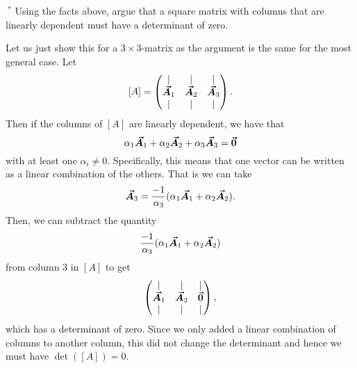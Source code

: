 \documentclass[12pt]{article} %
\begin{document}
\newpage
\begin{problem}$\boldsymbol{~^*}$
Using the facts above, argue that a square matrix with columns that are linearly dependent must have a determinant of zero.
\end{problem}
\begin{solution}
Let us just show this for a $3\times 3$-matrix as the argument is the same for the most general case.  Let 
\[
[A] = \begin{pmatrix} \vert & \vert & \vert \\ \boldsymbol{\vec{A}}_1 & \boldsymbol{\vec{A}}_2 & \boldsymbol{\vec{A}}_3 \\ \vert & \vert & \vert \end{pmatrix}.
\]
Then if the columns of $[A]$ are linearly dependent, we have that
\[
\alpha_1 \boldsymbol{\vec{A}}_1 + \alpha_2 \boldsymbol{\vec{A}}_2 + \alpha_3 \boldsymbol{\vec{A}}_3 = \boldsymbol{\vec{0}}
\]
with at least one $\alpha_i\neq 0$.  Specifically, this means that one vector can be written as a linear combination of the others. That is we can take
\[
\boldsymbol{\vec{A}}_3 = \frac{-1}{\alpha_3} (\alpha_1 \boldsymbol{\vec{A}}_1 + \alpha_2 \boldsymbol{\vec{A}}_2).
\]
Then, we can subtract the quantity 
\[
\frac{-1}{\alpha_3} (\alpha_1 \boldsymbol{\vec{A}}_1 + \alpha_2 \boldsymbol{\vec{A}}_2)
\]
from column 3 in $[A]$ to get
\[
\begin{pmatrix} \vert & \vert & \vert \\ \boldsymbol{\vec{A}}_1 & \boldsymbol{\vec{A}}_2 & \boldsymbol{\vec{0}} \\ \vert & \vert & \vert \end{pmatrix},
\]
which has a determinant of zero. Since we only added a linear combination of columns to another column, this did not change the determinant and hence we must have $\det([A])=0$.
\end{solution}
\end{document}
